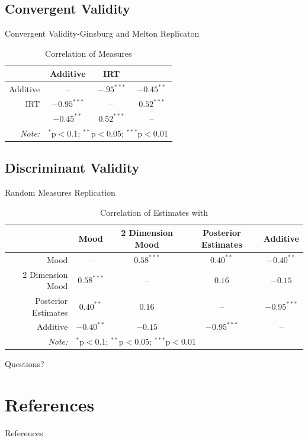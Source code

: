 \documentclass[compress]{beamer}
\begin{document}
\subsection{Convergent Validity}
\begin{frame}{Convergent Validity-Ginsburg and Melton Replicaton}
	\begin{table}[ht]
		\centering\caption*{Correlation of Measures}\label{Correlation}
		\begin{tabular}{rccc}
			\hline
			& Additive & IRT & \citeauthor{Melton2014} \\ 
			\hline
			Additive & -- & $-.95^{***}$ &$-0.45^{**}$ \\ 
			IRT & $-0.95^{***}$ & -- & $0.52^{***}$ \\ 
			\citeauthor{Melton2014} & $-0.45^{**}$  &  $0.52^{***}$ & --\\ 
			\hline
			\textit{Note:}  & \multicolumn{3}{l}{$^{*}$p$<$0.1; $^{**}$p$<$0.05; $^{***}$p$<$0.01} \\
		\end{tabular}
	\end{table}
\end{frame}
\subsection{Discriminant Validity}
\begin{frame}{Random Measures Replication}
	\begin{table}[ht]
		\centering\caption{Correlation of Estimates with \citet{Enns2013}}\label{EKCor}
		\begin{tabular}{rcccc}
			\hline
			&  Mood &  2 Dimension Mood & Posterior Estimates & Additive \\ 
			\hline
			Mood & -- & $0.58^{***}$ & $0.40^{**}$ & $-0.40^{**}$ \\ 
			2 Dimension Mood &  $0.58^{***}$ & -- & $0.16$ & $-0.15$ \\ 
			Posterior Estimates &  $0.40^{**}$  &  $0.16$  & -- & $-0.95^{***}$ \\ 
			Additive & $-0.40^{**}$  & $-0.15$  & $-0.95^{***}$ & -- \\ 
			\hline
			\textit{Note:}  & \multicolumn{4}{l}{$^{*}$p$<$0.1; $^{**}$p$<$0.05; $^{***}$p$<$0.01} \\
		\end{tabular}
	\end{table}
\end{frame}
\begin{frame}{Questions?}
	
\end{frame}
\newpage
\appendix
\section*{References}
\begin{frame}{References}


\end{frame}
\end{document}
